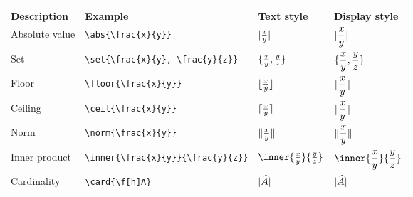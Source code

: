 \documentclass{article}
\begin{document}
\begin{center}
\begin{tabular}{@{}llll@{}}
\toprule
Description				& Example 					& Text style 				& Display style \\ \midrule
Absolute value 			& \verb!\abs{\frac{x}{y}}!        	& $\lvert\frac{x}{y}\rvert$ 		& $\displaystyle\lvert\frac{x}{y}\rvert$ \\[10pt]
Set 					& \verb!\set{\frac{x}{y}, \frac{y}{z}}!        & $\{\frac{x}{y}, \frac{y}{z}\}$ 	& $\displaystyle\{\frac{x}{y}, \frac{y}{z}\}$ \\[10pt]
Floor					& \verb!\floor{\frac{x}{y}}!        	& $\lfloor\frac{x}{y}\rfloor$ 		& $\displaystyle\lfloor\frac{x}{y}\rfloor$ \\[10pt]
Ceiling 				& \verb!\ceil{\frac{x}{y}}!        	& $\lceil\frac{x}{y}\rceil$ 		& $\displaystyle\lceil\frac{x}{y}\rceil$ \\[10pt]
Norm					& \verb!\norm{\frac{x}{y}}!       	& $\lVert\frac{x}{y}\rVert$ 	& $\displaystyle\lVert\frac{x}{y}\rVert$ \\[10pt]
Inner product			& \verb!\inner{\frac{x}{y}}{\frac{y}{z}}!       	& $\inner{\frac{x}{y}}{\frac{y}{z}}$ 	& $\displaystyle\inner{\frac{x}{y}}{\frac{y}{z}}$ \\[10pt]
Cardinality 				& \verb!\card{\f[h]A}!       		& $\card{\f[h]A}$ 			& $\displaystyle\card{\f[h]A}$ \\[10pt]
\bottomrule
\end{tabular}
\end{center}

%
\end{document}

